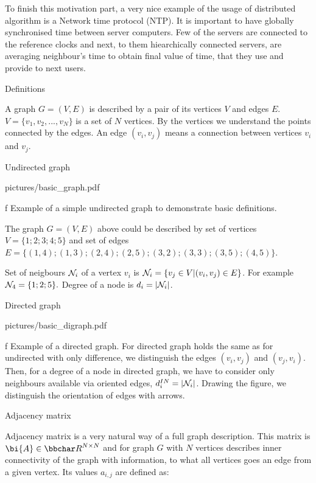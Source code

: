 To finish this motivation part, a very nice example of the usage of distributed algorithm is a Network time protocol (NTP). It is important to have globally synchronised time between server computers. Few of the servers are connected to the reference clocks and next, to them hiearchically connected servers, are averaging neighbour's time to obtain final value of time, that they use and provide to next users.


\sec Definitions

A graph $G=(V, E)$ is described by a pair of its vertices $V$ and edges $E$. ${V=\{ v_1, v_2, ..., v_N \}}$ is a set of $N$ vertices. By the vertices we understand the points connected by the edges. 
An edge $\left( v_i, v_j \right)$ means a connection between vertices $v_i$ and $v_j$.

\secc Undirected graph

\midinsert
\picw=8cm \cinspic pictures/basic_graph.pdf
\caption/f Example of a simple undirected graph to demonstrate basic definitions. 
\endinsert

The graph $G=(V, E)$ above could be described by set of vertices ${V=\{ 1; 2; 3; 4; 5\}}$ and set of edges  $E=\{ (1, 4); (1, 3); (2, 4); (2,5); (3, 2); (3, 3); (3, 5); (4, 5) \}$.

Set of neigbours $ {\cal{N}}_i $ of a vertex $v_i$ is $ {\cal{N}}_i = \{ v_j \in V | (v_i , v_j)\in E \} $. For example $ {\cal{N}}_4 = \{1; 2; 5 \} .$ Degree of a node is  $d_i= |{\cal{N}}_i |$.

\secc Directed graph

\midinsert
\picw=10cm \cinspic pictures/basic_digraph.pdf
\caption/f Example of a directed graph. 
\endinsert
For directed graph holds the same as for undirected with only difference, we distinguish the edges 
$ ( v_i, v_j ) $ and $ ( v_j, v_i ) . $ Then, for a degree of a node in directed graph, we have to consider only neighbours available via oriented edges,  $d_i^{IN}= |{\cal{N}}_i |$. Drawing the figure, we distinguish the orientation of edges with arrows.




\secc Adjacency matrix 

Adjacency matrix is a very natural way of a full graph description. This matrix is ${\bi{A}} \in {\bbchar R}^{N\times{N}}$ and for graph $G$ with $N$ vertices describes inner connectivity of the graph with information, to what all vertices goes an edge from a given vertex.  Its values $a_{i,j}$ are defined as: 



